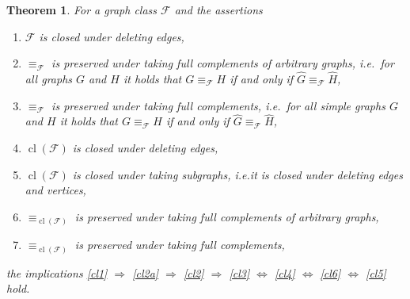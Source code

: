 \documentclass[3p,final]{elsarticle}
\DeclareMathOperator{\cl}{cl}
\newtheorem{theorem}{Theorem}
\begin{document}
	\begin{theorem} \label{thm:full-complement}
		For a graph class $\mathcal{F}$ and the assertions
		\begin{enumerate}
			\item $\mathcal{F}$ is closed under deleting edges,\label{cl1}
			\item $\equiv_{\mathcal{F}}$ is \emph{preserved under taking full complements of arbitrary graphs}, i.e.\  for all graphs $G$ and $H$ it holds that $G \equiv_{\mathcal{F}} H$ if and only if $\widehat{G} \equiv_{\mathcal{F}} \widehat{H}$,\label{cl2a}			
			\item $\equiv_{\mathcal{F}}$ is \emph{preserved under taking full complements}, i.e.\  for all simple graphs $G$ and $H$ it holds that $G \equiv_{\mathcal{F}} H$ if and only if $\widehat{G} \equiv_{\mathcal{F}} \widehat{H}$,\label{cl2}
			\item $\cl(\mathcal{F})$ is closed under deleting edges,\label{cl3}
			\item $\cl(\mathcal{F})$ is \emph{closed under taking subgraphs}, i.e.\@ it is closed under deleting edges and vertices,\label{cl4}
			\item $\equiv_{\cl(\mathcal{F})}$ is preserved under taking full complements of arbitrary graphs,\label{cl6}
			\item $\equiv_{\cl(\mathcal{F})}$ is preserved under taking full complements,\label{cl5}
		\end{enumerate}
		the implications \ref{cl1} $\Rightarrow$ \ref{cl2a} $\Rightarrow$ \ref{cl2} $\Rightarrow$ \ref{cl3} $\Leftrightarrow$ \ref{cl4} $\Leftrightarrow$ \ref{cl6} $\Leftrightarrow$ \ref{cl5} hold.
	\end{theorem}
\end{document}
